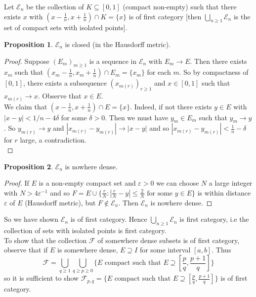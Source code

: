 \documentclass[a4paper, 10pt, twocolumn]{amsart}
\theoremstyle{definition}
\newtheorem*{proposition}{Proposition}
\newcommand{\eps}[0]{\varepsilon}
\newcommand{\sbs}[0]{\subseteq}
\renewcommand{\cal}[1]{\mathcal{#1}}
\newcommand{\1}{\mathbbm{1}}
\begin{document}
Let $\cal{E}_n$ be the collection of $K \sbs [0,1]$ (compact non-empty) such that there exists $x$ with $(x-\frac{1}{n},x+\frac{1}{n})\cap K = \{x\}$ is of first category [then $\bigcup_{n\ge 1}\cal{E}_n$ is the set of compact sets with isolated points].

\begin{proposition}
    $\cal{E}_n$ is closed (in the Hausdorff metric).
\end{proposition}

\begin{proof}
    Suppose $(E_m)_{m\ge 1}$ is a sequence in $\cal{E}_n$ with $E_m \to E$. Then there exists $x_m$ such that $(x_m-\frac{1}{n},x_m+\frac{1}{n}) \cap E_m  =\{x_m\}$ for each $m$. So by compactness of $[0,1]$, there exists a subsequence $(x_{m(r)})_{r\ge 1}$ and $x \in [0,1]$ such that $x_{m(r)} \to x$. Observe that $x \in E$.\\
    
    We claim that $(x-\frac{1}{n},x+\frac{1}{n}) \cap E = \{x\}$. Indeed, if not there exists $y \in E$ with $|x-y| < 1/n -4\delta$ for some $\delta>0$. Then we must have $y_m \in E_m$ such that $y_m \to y$. So $y_{m(r)} \to y$ and $|x_{m(r)}-y_{m(r)}| \to |x-y|$ and so $|x_{m(r)}-y_{m(r)}| < \frac{1}{n}-\delta$ for $r$ large, a contradiction.\\
\end{proof}

\begin{proposition}
    $\cal{E}_n$ is nowhere dense.
\end{proposition}

\begin{proof}
    If $E$ is a non-empty compact set and $\eps>0$ we can choose $N$ a large integer with $N>4\eps^{-1}$ and so $F = E \cup \{\frac{r}{N} : \left|\frac{r}{N} -y\right| \le \frac{2}{N}\text{ for some } y \in E\}$ is within distance $\eps$ of $E$ (Hausdorff metric), but $F \not\in \cal{E}_n$. Then $\cal{E}_n$ is nowhere dense.
\end{proof}

So we have shown $\cal{E}_n$ is of first category. Hence $\bigcup_{n\ge 1}\cal{E}_n$ is first category, i.e the collection of sets with isolated points is first category.\\

To show that the collection $\cal{F}$ of somewhere dense subsets is of first category, observe that if $E$ is somewhere dense, $E \supseteq I$ for some interval $[a,b]$. Thus \[\cal{F} = \bigcup_{q \ge 1} \bigcup_{q\ge p\ge 0} \{E\text{ compact such that } E\supseteq \left[\frac{p}{q},\frac{p+1}{q}\right]\}\]
so it is sufficient to show $\cal{F}_{p,q} = \{E\text{ compact such that } E\supseteq \left[\frac{p}{q},\frac{p+1}{q}\right]\}$ is of first category.
\end{document}
